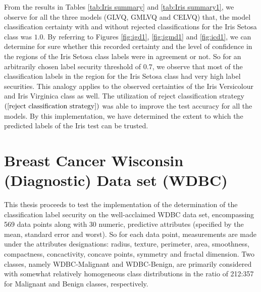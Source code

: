\documentclass[english]{HSMW-Thesis}
\begin{document}
From the results in Tables \ref{tab:Iris summary} and \ref{tab:Iris summary1}, we observe for all the three models (GLVQ, GMLVQ and CELVQ) that, the model classification certainty with and without rejected classifications for the Iris Setosa class was\hspace{2pt} $1.0$\hspace{2pt}. By referring to Figures \ref{fig:igd1}, \ref{fig:igmd1} and \ref{fig:icd1}, we can determine for sure whether this recorded certainty and the level of confidence in the regions of the Iris Setosa class labels were in agreement or not. So for an arbitrarily chosen label security threshold of\hspace{2pt} $0.7$, we observe that most of the classification labels in the region for the Iris Setosa class had very high label securities. This analogy applies to the observed certainties of the Iris Versicolour and Iris Virginica class as well. The utilization of reject classification strategy $\left( \ref{reject classification strategy}\right) $ was able to improve the test accuracy for all the models. By this implementation, we have determined the extent to which the predicted labels of the Iris test can be trusted.



\section{Breast Cancer Wisconsin (Diagnostic) Data set (WDBC)}
This thesis proceeds to test the implementation of the determination of the classification label security on the well-acclaimed WDBC data set\cite{street1993nuclear}, encompassing 569 data points along with 30 numeric, predictive attributes (specified by the mean, standard error and worst). So for each data point, measurements are made under the attributes designations: radius, texture, perimeter, area, smoothness, compactness, concactivity, concave points, symmetry and fractal dimension. Two classes, namely WDBC-Malignant and WDBC-Benign, are primarily considered with somewhat relatively homogeneous class distributions in the ratio of  212:357 for Malignant and Benign classes, respectively.
\end{document}
